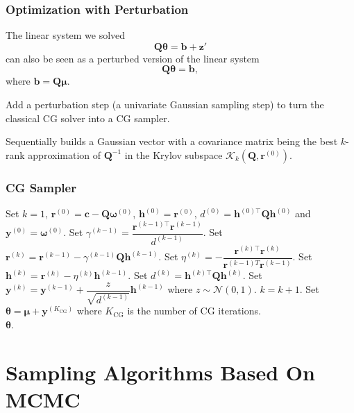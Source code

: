 \documentclass[aspectratio=169]{beamer}
\newcommand{\B}[1]{\mathbf{#1}} %
\newcommand{\Bs}[1]{\boldsymbol{#1}} %
\newcommand{\nr}[1]{\left\|#1\right\|} %
\begin{document}
\begin{frame}
\frametitle{Optimization with Perturbation}
The linear system we solved
\[\B{Q}\Bs{\theta} = \B{b} + \B{z}'\]
can also be seen as a perturbed version of the linear system
\[\B{Q}\Bs{\theta} = \B{b},\]
where $\B{b} = \B{Q}\Bs{\mu}$.

Add a perturbation step (a univariate Gaussian sampling step) to turn the classical CG solver into a CG sampler.

Sequentially builds a Gaussian vector with a covariance matrix being the best $k$-rank approximation of $\B{Q}^{-1}$ in the Krylov subspace $\mathcal{K}_k(\B{Q},\B{r}^{(0)})$. 
\end{frame}

\begin{frame}
\frametitle{CG Sampler}
\begin{algorithmic}[1]
    \State Set $k=1$, $\B{r}^{(0)} = \B{c} - \B{Q}\Bs{\omega}^{(0)}$, $\B{h}^{(0)} = \B{r}^{(0)}$, $d^{(0)} = \B{h}^{(0)\top}\B{Qh}^{(0)}$ and $\B{y}^{(0)} = \Bs{\omega}^{(0)}$. 
    \While{$\nr{\B{r}^{(k)}} \geq \epsilon$} 
    \State Set $\gamma^{(k-1)} = \dfrac{\B{r}^{(k-1)\top}\B{r}^{(k-1)}}{d^{(k-1)}}$.
    \State Set $\B{r}^{(k)} = \B{r}^{(k-1)} - \gamma^{(k-1)}\B{Qh}^{(k-1)}$.
    \State Set $\eta^{(k)} = -\dfrac{\B{r}^{(k)\top}\B{r}^{(k)}}{\B{r}^{(k-1)T}\B{r}^{(k-1)}}$.
    \State Set $\B{h}^{(k)} = \B{r}^{(k)} - \eta^{(k)}\B{h}^{(k-1)}$.
    \State Set $d^{(k)} = \B{h}^{(k)\top}\B{Qh}^{(k)}$.
    \State Set $\B{y}^{(k)} = \B{y}^{(k-1)} + \dfrac{z}{\sqrt{d^{(k-1)}}}\B{h}^{(k-1)}$ where $z \sim \mathcal{N}(0,1)$. \Comment{\textcolor{blue}{Perturbation}} 
    \State $k = k + 1$.
    \EndWhile
    \State Set $\Bs{\theta} = \Bs{\mu} + \B{y}^{(K_{\mathrm{CG}})}$ where $K_{\mathrm{CG}}$ is the number of CG iterations.\\
\Return $\Bs{\theta}$.
\end{algorithmic}
\end{frame}

\section{Sampling Algorithms Based On MCMC}
\end{document}
